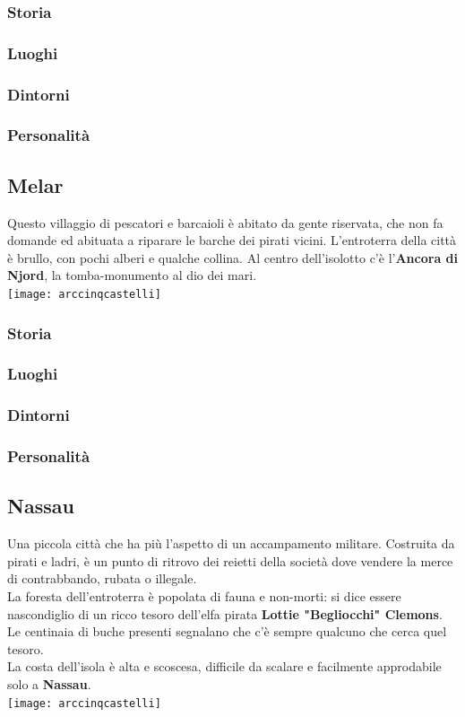 \documentclass[10pt,twoside,onecolumn,openany]{book}
\begin{document}
\subsubsection{Storia}
\subsubsection{Luoghi}
\subsubsection{Dintorni}
\subsubsection{Personalità}
\newpage
\subsection{Melar}
Questo villaggio di pescatori e barcaioli è abitato da gente riservata, che non fa domande ed abituata a riparare le barche dei pirati vicini. L'entroterra della città è brullo, con pochi alberi e qualche collina. Al centro dell'isolotto c'è l'\textbf{Ancora di Njord}, la tomba-monumento al dio dei mari.\\
\texttt{[image: arccinqcastelli]}
\subsubsection{Storia}
\subsubsection{Luoghi}
\subsubsection{Dintorni}
\subsubsection{Personalità}
\newpage
\subsection{Nassau}
Una piccola città che ha più l'aspetto di un accampamento militare. Costruita da pirati e ladri, è un punto di ritrovo dei reietti della società dove vendere la merce di contrabbando, rubata o illegale.\\
La foresta dell'entroterra è popolata di fauna e non-morti: si dice essere nascondiglio di un ricco tesoro dell'elfa pirata \textbf{Lottie "Begliocchi" Clemons}. Le centinaia di buche presenti segnalano che c'è sempre qualcuno che cerca quel tesoro.\\
La costa dell'isola è alta e scoscesa, difficile da scalare e facilmente approdabile solo a \textbf{Nassau}.\\
\texttt{[image: arccinqcastelli]}
\end{document}
